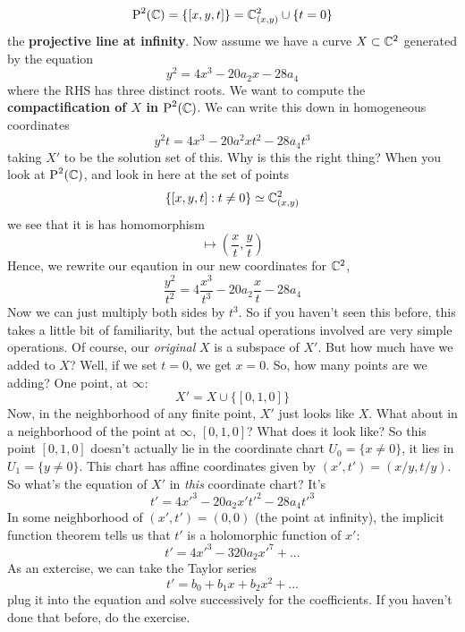 \documentclass{article}
\begin{document}
\begin{equation}
  \operatorname{P}^{2}({\mathbb{C}}) = \{[x, y, t]\} = \mathbb{C}^2_{(x, y)} \cup \{t = 0\}
\end{equation}
the \textbf{projective line at infinity}.
Now assume we have a curve \(X \subset \mathbb{C}^2\) generated by the equation
\begin{equation}y^2 = 4x^3 - 20a_2x - 28a_4\end{equation}
where the RHS has three distinct roots. We want to compute the \textbf{compactification of \(X\) in \(\operatorname{P}^{2}({\mathbb{C}})\)}. We can write this down in homogeneous coordinates
\begin{equation}y^2t = 4x^3 - 20a^2xt^2 - 28a_4t^3\end{equation}
taking \(X'\) to be the solution set of this.
Why is this the right thing? When you look at \(\operatorname{P}^{2}({\mathbb{C}})\), and look in here at the set of points
\begin{equation}\{[x, y, t]: t \neq 0\} \simeq \mathbb{C}^2_{(x, y)}\end{equation}
we see that it is has homomorphism
\begin{equation}[x, y, t] \mapsto \left(\frac{x}{t}, \frac{y}{t}\right)\end{equation}
Hence, we rewrite our eqaution in our new coordinates for \(\mathbb{C}^2\),
\begin{equation}\frac{y^2}{t^2} = 4\frac{x^3}{t^3} - 20a_2\frac{x}{t} - 28a_4\end{equation}
Now we can just multiply both sides by \(t^3\). So if you haven't seen this before, this takes a little bit of familiarity, but the actual operations involved are very simple operations. Of course, our \textit{original} \(X\) is a subspace of \(X'\). But how much have we added to \(X\)? Well, if we set \(t = 0\), we get \(x = 0\). So, how many points are we adding? One point, at \(\infty\):
\begin{equation}X' = X \cup \{[0, 1, 0]\}\end{equation}
Now, in the neighborhood of any finite point, \(X'\) just looks like \(X\). What about in a neighborhood of the point at \(\infty\), \([0, 1, 0]\)? What does it look like?
So this point \([0, 1, 0]\) doesn't actually lie in the coordinate chart \(U_0 = \{x \neq 0\}\), it lies in \(U_1 = \{y \neq 0\}\). This chart has affine coordinates given by \((x', t') = (x/y, t/y)\). So what's the equation of \(X'\) in \textit{this} coordinate chart? It's
\begin{equation}
  t' = 4x'^3 - 20a_2x't'^2 - 28a_4t'^3
\end{equation}
In some neighborhood of \((x', t') = (0, 0)\) (the point at infinity), the implicit function theorem tells us that \(t'\) is a holomorphic function of \(x'\):
\begin{equation}
  t' = 4x'^3 - 320a_2x'^7 + ...
  \label{equation:tprime_from_xprime}
\end{equation}
As an extercise, we can take the Taylor series
\begin{equation}
  t' = b_0 + b_1x + b_2x^2 + ...
\end{equation}
plug it into the equation and solve successively for the coefficients. If you haven't done that before, do the exercise.
\end{document}
